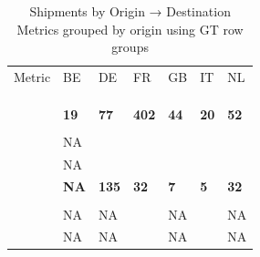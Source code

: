 \documentclass[
  american,
  10,
  a4paper,
]{book}
\theoremstyle{definition}
\theoremstyle{remark}
\begin{document}
\begin{table}
\caption*{
{\large Shipments by Origin → Destination} \\ 
{\small Metrics grouped by origin using GT row groups}
} 
\fontsize{12.0pt}{14.4pt}\selectfont
\begin{tabular*}{\linewidth}{@{\extracolsep{\fill}}>{\raggedright\arraybackslash}p{\dimexpr 90.00pt -2\tabcolsep-1.5\arrayrulewidth}>{\centering\arraybackslash}p{\dimexpr 60.00pt -2\tabcolsep-1.5\arrayrulewidth}>{\centering\arraybackslash}p{\dimexpr 60.00pt -2\tabcolsep-1.5\arrayrulewidth}>{\centering\arraybackslash}p{\dimexpr 60.00pt -2\tabcolsep-1.5\arrayrulewidth}>{\centering\arraybackslash}p{\dimexpr 60.00pt -2\tabcolsep-1.5\arrayrulewidth}>{\centering\arraybackslash}p{\dimexpr 60.00pt -2\tabcolsep-1.5\arrayrulewidth}>{\centering\arraybackslash}p{\dimexpr 60.00pt -2\tabcolsep-1.5\arrayrulewidth}}
\toprule
 & \multicolumn{6}{>{\centering\arraybackslash}m{\dimexpr 390.00pt -2\tabcolsep-1.5\arrayrulewidth}}{TO} \\ 
\cmidrule(lr){2-7}
Metric & BE & DE & FR & GB & IT & NL \\ 
\midrule\addlinespace[2.5pt]
\multicolumn{7}{>{\raggedright\arraybackslash}m{510pt}}{{\bfseries 3P}} \\[2.5pt] 
\midrule\addlinespace[2.5pt]
{\itshape Count (n)} & 2 & 8 & 13 & 7 & 5 & 11 \\ 
{\itshape Average Items} & 14.0 & 18.9 & 97.1 & 17.9 & 10.6 & 18.7 \\ 
{\itshape Max Items} & {\bfseries 19} & {\bfseries 77} & {\bfseries 402} & {\bfseries 44} & {\bfseries 20} & {\bfseries 52} \\ 
\midrule\addlinespace[2.5pt]
\multicolumn{7}{>{\raggedright\arraybackslash}m{510pt}}{{\bfseries DE}} \\[2.5pt] 
\midrule\addlinespace[2.5pt]
{\itshape Count (n)} & NA & 4 & 3 & 2 & 2 & 3 \\ 
{\itshape Average Items} & NA & 58.5 & 21.0 & 4.5 & 3.5 & 17.3 \\ 
{\itshape Max Items} & {\bfseries NA} & {\bfseries 135} & {\bfseries 32} & {\bfseries 7} & {\bfseries 5} & {\bfseries 32} \\ 
\midrule\addlinespace[2.5pt]
\multicolumn{7}{>{\raggedright\arraybackslash}m{510pt}}{{\bfseries ES}} \\[2.5pt] 
\midrule\addlinespace[2.5pt]
{\itshape Count (n)} & NA & NA & 3 & NA & 2 & NA \\ 
{\itshape Average Items} & NA & NA & 2.3 & NA & 5.5 & NA \\ 

\end{tabular*}
\end{table}
\end{document}
